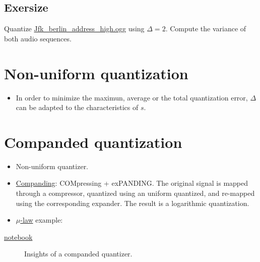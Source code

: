 \begin{itemize}
\end{itemize}

\subsection{Exersize}
Quantize
\href{https://upload.wikimedia.org/wikipedia/commons/3/3a/Jfk_berlin_address_high.ogg}{Jfk\_berlin\_address\_high.ogg}
using \(\Delta=2\). Compute the variance of both audio sequences.

\section{Non-uniform quantization}
\begin{itemize}
  \tightlist
\item
  In order to minimize the maximun, average or the total quantization
  error, \(\Delta\) can be adapted to the characteristics of \(s\).
\end{itemize}

\section{Companded quantization~\cite{sayood2017introduction}}
\begin{itemize}
\item
  Non-uniform quantizer.
\item
  \href{https://en.wikipedia.org/wiki/Companding}{Companding}:
  COMpressing + exPANDING. The original signal is mapped through a
  compressor, quantized using an uniform quantized, and re-mapped using
  the corresponding expander. The result is a logarithmic quantization.
\item
  \href{https://en.wikipedia.org/wiki/\%CE\%9C-law_algorithm}{\(\mu\)-law}
  example:
\end{itemize}

\href{https://nbviewer.jupyter.org/github/vicente-gonzalez-ruiz/quantization/blob/master/graphics/companded_quantization.ipynb}{notebook}

\begin{figure}
  \caption{Insights of a companded quantizer.}
  \label{fig:companded_quantizer}
\end{figure}

